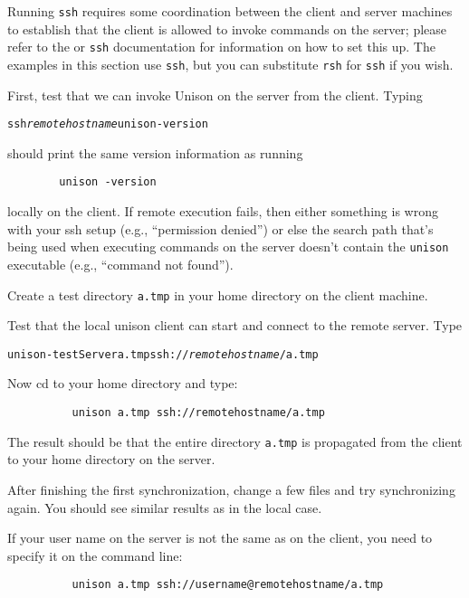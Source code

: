 \documentclass{article}
\newcommand{\NT}[1]{\textit{#1}}
\begin{document}
Running
\verb|ssh| requires some coordination between the client and server
machines to establish that the client is allowed to invoke commands on
the server; please refer to the or \verb|ssh| documentation
for information on how to set this up.  The examples in this section
use \verb|ssh|, but you can substitute \verb|rsh| for \verb|ssh| if
you wish.

First, test that we can invoke Unison on the server from the client.
Typing
\begin{alltt}
        ssh \NT{remotehostname} unison -version
\end{alltt}
should print the same version information as running
\begin{verbatim}
        unison -version
\end{verbatim}
locally on the client.  If remote execution fails, then either
something is wrong with your ssh setup (e.g., ``permission denied'')
or else the search path that's being used when executing commands on
the server doesn't contain the \verb|unison| executable (e.g.,
``command not found'').

Create a test directory {\tt a.tmp} in your home directory on the client
machine.  

Test that the local unison client can start and connect to the
remote server.  Type
\begin{alltt}
          unison -testServer a.tmp ssh://\NT{remotehostname}/a.tmp
\end{alltt}

Now cd to your home directory and type:
\begin{verbatim}
          unison a.tmp ssh://remotehostname/a.tmp
\end{verbatim}
The result should be that the entire directory {\tt a.tmp} is propagated
from the client to your home directory on the server.

After finishing the first synchronization, change a few files and try
synchronizing again.  You should see similar results as in the local
case.

If your user name on the server is not the same as on the client, you
need to specify it on the command line:
\begin{verbatim}
          unison a.tmp ssh://username@remotehostname/a.tmp
\end{verbatim}
\end{document}
